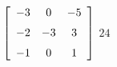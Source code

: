 {$\left[ \begin {array}{ccc} -3&0&-5\\\noalign{\medskip}-2&-3&3
\\\noalign{\medskip}-1&0&1\end {array} \right]$} 
{$24$}



  


